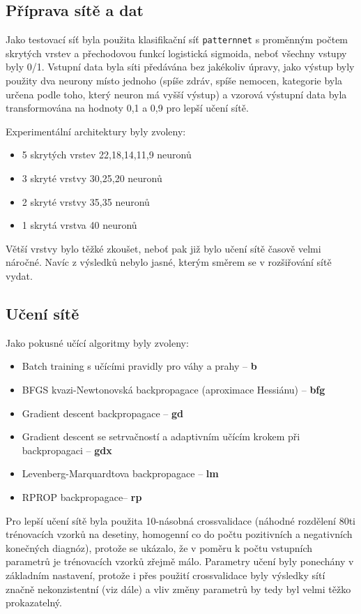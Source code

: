 \documentclass[journal]{IEEEtrancz}
\begin{document}
\subsection{Příprava sítě a dat}
Jako testovací síť byla použita klasifikační síť \texttt{patternnet} s proměnným počtem skrytých vrstev a přechodovou funkcí logistická sigmoida, neboť všechny vstupy byly 0/1. Vstupní data byla síti předávána bez jakékoliv úpravy, jako výstup byly použity dva neurony místo jednoho (spíše zdráv, spíše nemocen, kategorie byla určena podle toho, který neuron má vyšší výstup) a vzorová výstupní data byla transformována na hodnoty 0,1 a 0,9 pro lepší učení sítě.

Experimentální architektury byly zvoleny:
\begin{itemize}
    \item 5 skrytých vrstev 22,18,14,11,9 neuronů
    \item 3 skryté vrstvy 30,25,20 neuronů
    \item 2 skryté vrstvy 35,35 neuronů
    \item 1 skrytá vrstva 40 neuronů
\end{itemize}
Větší vrstvy bylo těžké zkoušet, neboť pak již bylo učení sítě časově velmi náročné. Navíc z výsledků nebylo jasné, kterým směrem se v rozšiřování sítě vydat.

\subsection{Učení sítě}
Jako pokusné učící algoritmy byly zvoleny:
\begin{itemize}
    \item Batch training s učícími pravidly pro váhy a prahy -- \textbf{b}
    \item BFGS kvazi-Newtonovská backpropagace (aproximace Hessiánu) -- \textbf{bfg}
    \item Gradient descent backpropagace -- \textbf{gd}
    \item Gradient descent se setrvačností a adaptivním učícím krokem při backpropagaci -- \textbf{gdx}
    \item Levenberg-Marquardtova backpropagace -- \textbf{lm}
    \item RPROP backpropagace-- \textbf{rp}
\end{itemize}
Pro lepší učení sítě byla použita 10-násobná crossvalidace (náhodné rozdělení 80ti trénovacích vzorků na desetiny, homogenní co do počtu pozitivních a negativních konečných diagnóz), protože se ukázalo, že v poměru k počtu vstupních parametrů je trénovacích vzorků zřejmě málo. Parametry učení byly ponechány v základním nastavení, protože i přes použití crossvalidace byly výsledky sítí značně nekonzistentní (viz dále) a vliv změny parametrů by tedy byl velmi těžko prokazatelný.
\end{document}
